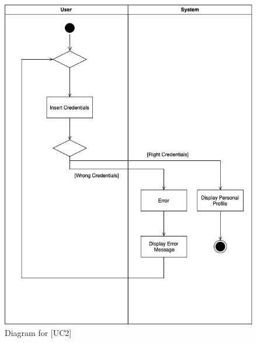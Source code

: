 \documentclass[12pt,oneside,a4paper]{article}
\begin{document}
\begin{figure}[htbp]
    \centering
    \includegraphics[width=1\linewidth]{Images/Diagrams/LogIn.png}
    \caption{Diagram for [UC2]}
    \label{fig:enter-label}
\end{figure}
\end{document}
